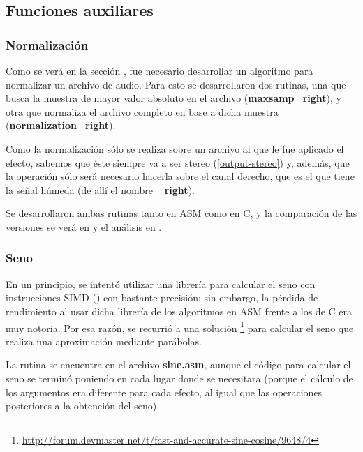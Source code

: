 \subsection{Funciones auxiliares}
\label{subsec:desarrollo-auxiliares}

\subsubsection{Normalización}
\label{subsec:desarrollo-normalizacion}
Como se verá en la sección , fue necesario desarrollar un algoritmo para normalizar un archivo de audio. Para esto se desarrollaron dos rutinas, una que busca la muestra de mayor valor absoluto en el archivo (\textbf{maxsamp\_right}), y otra que normaliza el  archivo completo en base a dicha muestra (\textbf{normalization\_right}).

Como la normalización sólo se realiza sobre un archivo al que le fue aplicado el efecto, sabemos que éste siempre va a ser stereo (\ref{output-stereo}) y, además, que la operación sólo será necesario hacerla sobre el canal derecho, que es el que tiene la señal húmeda (de allí el nombre \textbf{\_right}).

Se desarrollaron ambas rutinas tanto en ASM como en C, y la comparación de las versiones se verá en  y el análisis en .

\subsubsection{Seno}
\label{subsec:desarrollo-seno}
En un principio, se intentó utilizar una librería para calcular el seno con instrucciones SIMD () con bastante precisión; sin embargo, la pérdida de rendimiento al usar dicha librería de los algoritmos en ASM frente a los de C era muy notoria. Por esa razón, se recurrió a una solución \footnote{\url{http://forum.devmaster.net/t/fast-and-accurate-sine-cosine/9648/4}} para calcular el seno que realiza una aproximación mediante parábolas.

La rutina se encuentra en el archivo \textbf{sine.asm}, aunque el código para calcular el seno se terminó poniendo en cada lugar donde se necesitara (porque el cálculo de los argumentos era diferente para cada efecto, al igual que las operaciones posteriores a la obtención del seno).
